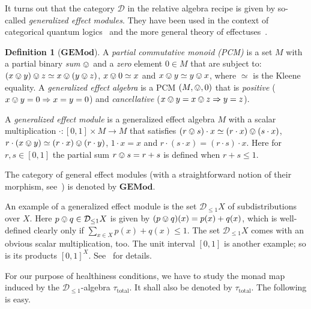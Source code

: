 \documentclass[9pt, preprint]{sigplanconf}
\theoremstyle{theorem}
\theoremstyle{definition}
\newtheorem{definition}[theorem]{Definition}
\newcommand{\cat}[1]{\mathcal{#1}}
\newcommand{\sdist}{\mathcal{D}_{\le 1}}
\newcommand{\uintv}{[0, 1]}
\newcommand{\GEMod}{\mathbf{GEMod}}
\newcommand{\tauTotal}{\tau_{\mathrm{total}}}
\begin{document}
It turns out that the category $\cat{D}$ in the relative algebra recipe is
given by so-called \emph{generalized effect modules}. They have been
used in the context of categorical quantum logics~\cite{Jacobs15LMCS}
and the more general theory of effectuses~\cite{ChoJWW15Arxiv}.

\begin{definition}[$\GEMod$]
\label{def:gemod}
 A \emph{partial commutative monoid (PCM)} is a set $M$ with a partial binary
 \emph{sum} $\ovee$ and a \emph{zero} element $0 \in M$ that are subject
 to:
 $(x\ovee y) \ovee z \simeq x \ovee (y \ovee z)$,
 $x \ovee 0 \simeq x$ and $x \ovee y \simeq y \ovee x$,
 where $\simeq$ is the Kleene equality.
 A \emph{generalized effect algebra} is a PCM $(M, \ovee, 0)$
 that is  \emph{positive}
 ($x \ovee y = 0 \Rightarrow x = y = 0$)
 and \emph{cancellative} ($x \ovee y = x \ovee z \Rightarrow y = z$).

 A \emph{generalized effect module} is a generalized effect algebra $M$
 with a scalar multiplication ${\cdot} \colon [0, 1] \times M \to M$
 that satisfies
 $(r \ovee s) \cdot x \simeq (r \cdot x) \ovee (s \cdot x)$,
 $r \cdot (x \ovee y) \simeq (r \cdot x) \ovee (r \cdot y)$,
 $1 \cdot x = x$ and $r \cdot (s \cdot x) = (r \cdot s) \cdot x$.
 Here for $r, s \in [0, 1]$
 the partial sum $r \ovee s = r + s$ is defined when $r + s \leq 1$.

 The category of general effect modules (with a straightforward notion
 of
 their morphism, see~\cite{Cho15}) is denoted by $\GEMod$.
\end{definition}
\noindent
An example of a generalized effect module is the set $\sdist
X$ of subdistributions over $X$. Here $p\ovee q\in\sdist X$ is given
by $(p\ovee q)(x)=p(x)+q(x)$, which is well-defined clearly only if
 $\sum_{x\in X}p(x)+q(x)\le 1$. The set $\sdist X$ comes with an obvious
 scalar multiplication, too.
The unit interval $\uintv$ is another example; so is its products
$\uintv^{X}$.
See~\cite{Cho15} for details.







For our purpose of healthiness conditions,
we have to study
the monad map induced by the $\sdist$-algebra $\tauTotal$. It shall
also be denoted by $\tauTotal$. The following is easy.
\end{document}

